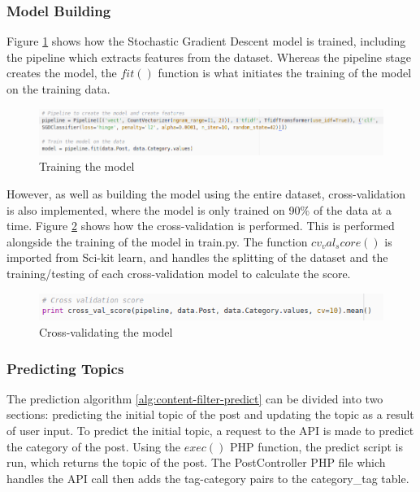 \subsubsection{Model Building}
Figure \ref{fig:imp-content-train} shows how the Stochastic Gradient Descent model is trained, including the pipeline which extracts features from the dataset. Whereas the pipeline stage creates the model, the $fit()$ function is what initiates the training of the model on the training data.

\begin{figure}[H]
\centering
\includegraphics[width=\textwidth]{Images/Implementation/content-train}
\caption{Training the model}
\label{fig:imp-content-train}
\end{figure}

However, as well as building the model using the entire dataset, cross-validation is also implemented, where the model is only trained on 90\% of the data at a time. Figure \ref{fig:content-cv} shows how the cross-validation is performed. This is performed alongside the training of the model in train.py. The function $cv_val_score()$ is imported from Sci-kit learn, and handles the splitting of the dataset and the training/testing of each cross-validation model to calculate the score.

\begin{figure}[H]
\centering
\includegraphics[width=\textwidth]{Images/Implementation/content-cv}
\caption{Cross-validating the model}
\label{fig:content-cv}
\end{figure}

\subsubsection{Predicting Topics}
The prediction algorithm \ref{alg:content-filter-predict} can be divided into two sections: predicting the initial topic of the post and updating the topic as a result of user input. To predict the initial topic, a request to the API is made to predict the category of the post. Using the $exec()$ PHP function, the predict script is run, which returns the topic of the post. The PostController PHP file which handles the API call then adds the tag-category pairs to the category\_tag table.

